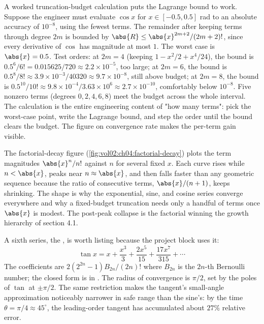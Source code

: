 A worked truncation-budget calculation puts the Lagrange bound to work.
Suppose the engineer must evaluate $\cos x$ for $x \in [-0.5, 0.5]$ rad
to an absolute accuracy of $10^{-8}$, using the fewest terms. The
remainder after keeping terms through degree $2m$ is bounded by
$\abs{R} \leq \abs{x}^{2m+2}/(2m+2)!$, since every derivative of
$\cos$ has magnitude at most $1$. The worst case is $\abs{x} = 0.5$.
Test orders: at $2m = 4$ (keeping $1 - x^{2}/2 + x^{4}/24$), the bound
is $0.5^{6}/6! = 0.015625/720 \approx 2.2 \times 10^{-5}$, too large;
at $2m = 6$, the bound is $0.5^{8}/8! \approx 3.9 \times
10^{-3}/40320 \approx 9.7 \times 10^{-8}$, still above budget; at
$2m = 8$, the bound is $0.5^{10}/10! \approx 9.8 \times
10^{-4}/3.63 \times 10^{6} \approx 2.7 \times 10^{-10}$, comfortably
below $10^{-8}$. Five nonzero terms (degrees $0, 2, 4, 6, 8$) meet the
budget across the whole interval. The calculation is the entire
engineering content of "how many terms": pick the worst-case point,
write the Lagrange bound, and step the order until the bound clears the
budget. The figure on convergence rate makes the per-term gain visible.



The factorial-decay figure
(\autoref{fig:vol02:ch04:factorial-decay}) plots the term magnitudes
$\abs{x}^{n}/n!$ against $n$ for several fixed $x$. Each curve rises
while $n < \abs{x}$, peaks near $n \approx \abs{x}$, and then falls
faster than any geometric sequence because the ratio of consecutive
terms, $\abs{x}/(n+1)$, keeps shrinking. The shape is why the
exponential, sine, and cosine series converge everywhere and why a
fixed-budget truncation needs only a handful of terms once $\abs{x}$ is
modest. The post-peak collapse is the factorial winning the growth
hierarchy of section 4.1.

A sixth series, the , is worth listing because the
project block uses it:
\[
\tan x = x + \frac{x^{3}}{3} + \frac{2 x^{5}}{15} + \frac{17 x^{7}}{315}
+ \cdots
\]
The coefficients are $2(2^{2n} - 1) B_{2n}/(2n)!$ where $B_{2n}$ is
the $2n$-th Bernoulli number; the closed form is in
\cite{text:v2ch04-abramowitz-stegun-1972}. The radius of convergence
is $\pi/2$, set by the poles of $\tan$ at $\pm \pi/2$. The same
restriction makes the tangent's small-angle approximation noticeably
narrower in safe range than the sine's: by the time $\theta = \pi/4
\approx 45^{\circ}$, the leading-order tangent has accumulated about
$27\%$ relative error.

